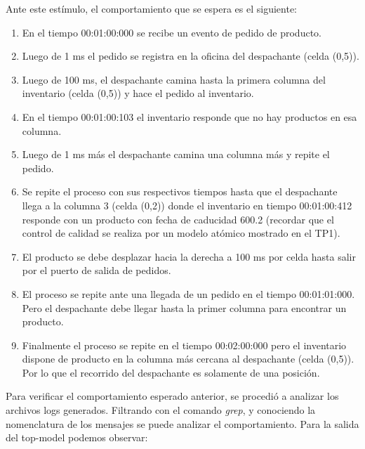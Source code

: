 \documentclass[10pt]{article}
\begin{document}
Ante este estímulo, el comportamiento que se espera es el siguiente:
\begin{enumerate}
	\item En el tiempo 00:01:00:000 se recibe un evento de pedido de producto.
	\item Luego de 1 ms el pedido se registra en la oficina del despachante (celda (0,5)).
	\item Luego de 100 ms, el despachante camina hasta la primera columna del inventario (celda (0,5)) y hace el pedido al inventario.
	\item En el tiempo 00:01:00:103 el inventario responde que no hay productos en esa columna.
	\item Luego de 1 ms más el despachante camina una columna más y repite el pedido.
	\item Se repite el proceso con sus respectivos tiempos hasta que el despachante llega a la columna 3 (celda (0,2)) donde el inventario en tiempo 00:01:00:412 responde con un producto con fecha de caducidad 600.2 (recordar que el control de calidad se realiza por un modelo atómico mostrado en el TP1).
	\item El producto se debe desplazar hacia la derecha a 100 ms por celda hasta salir por el puerto de salida de pedidos.
	\item El proceso se repite ante una llegada de un pedido en el tiempo 00:01:01:000. Pero el despachante debe llegar hasta la primer columna para encontrar un producto.
	\item Finalmente el proceso se repite en el tiempo 00:02:00:000 pero el inventario dispone de producto en la columna más cercana al despachante (celda (0,5)). Por lo que el recorrido del despachante es solamente de una posición.
\end{enumerate}

Para verificar el comportamiento esperado anterior, se procedió a analizar los archivos logs generados. Filtrando con el comando \textit{grep}, y conociendo la nomenclatura de los mensajes se puede analizar el comportamiento.
Para la salida del top-model podemos observar:
\end{document}
